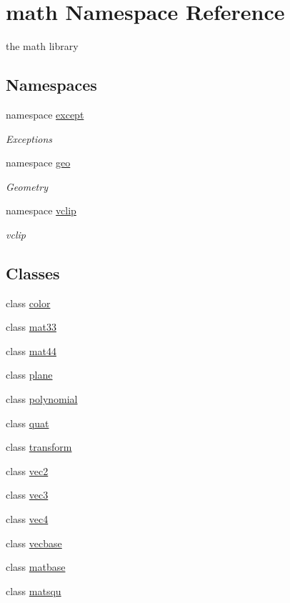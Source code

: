 \hypertarget{namespacemath}{
\section{math Namespace Reference}
\label{namespacemath}
}


the math library  
\subsection*{Namespaces}
\begin{DoxyCompactItemize}
\item 
namespace \hyperlink{namespacemath_1_1except}{except}


\begin{DoxyCompactList}\small\item\em Exceptions \item\end{DoxyCompactList}\item 
namespace \hyperlink{namespacemath_1_1geo}{geo}


\begin{DoxyCompactList}\small\item\em Geometry \item\end{DoxyCompactList}\item 
namespace \hyperlink{namespacemath_1_1vclip}{vclip}


\begin{DoxyCompactList}\small\item\em vclip \item\end{DoxyCompactList}\end{DoxyCompactItemize}
\subsection*{Classes}
\begin{DoxyCompactItemize}
\item 
class \hyperlink{classmath_1_1color}{color}
\item 
class \hyperlink{classmath_1_1mat33}{mat33}
\item 
class \hyperlink{classmath_1_1mat44}{mat44}
\item 
class \hyperlink{classmath_1_1plane}{plane}
\item 
class \hyperlink{classmath_1_1polynomial}{polynomial}
\item 
class \hyperlink{classmath_1_1quat}{quat}
\item 
class \hyperlink{classmath_1_1transform}{transform}
\item 
class \hyperlink{classmath_1_1vec2}{vec2}
\item 
class \hyperlink{classmath_1_1vec3}{vec3}
\item 
class \hyperlink{classmath_1_1vec4}{vec4}
\item 
class \hyperlink{classmath_1_1vecbase}{vecbase}
\item 
class \hyperlink{classmath_1_1matbase}{matbase}
\item 
class \hyperlink{classmath_1_1matsqu}{matsqu}
\end{DoxyCompactItemize}
